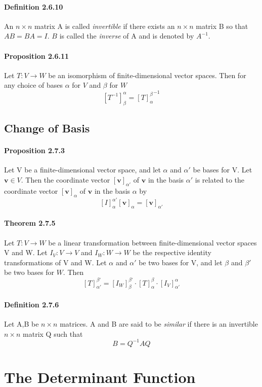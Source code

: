 \documentclass[11pt]{article}
\newcommand{\ti}[1]{\textit{#1}}
\newcommand{\tb}[1]{\textbf{#1}}
\newcommand{\litran}[0]{$T: V \rightarrow W$ }
\newcommand{\vv}[0]{\tb{v}}
\begin{document}
{\paragraph{Definition 2.6.10} An $n \times n$ matrix A is called \ti{invertible} if there exists an $n\times n$ matrix B so that $AB = BA = I$. $B$ is called the \ti{inverse} of A and is denoted by $A^{-1}$.
\paragraph{Proposition 2.6.11} Let \litran be an isomorphism of finite-dimensional vector spaces. Then for any choice of bases $\alpha$ for $V$ and $\beta$ for $W$
$$[T^{-1}]_\beta^\alpha = {[T]_\alpha^{\beta}}^{-1}$$

\subsection{Change of Basis}
\paragraph{Proposition 2.7.3} Let V be a finite-dimensional vector space, and let $\alpha$ and $\alpha'$ be bases for V. Let $\vv \in V$. Then the coordinate vector $[\vv]_{\alpha'}$ of $\vv$ in the basis $\alpha'$ is related to the coordinate vector $[\vv]_\alpha$ of $\vv$ in the basis $\alpha$ by $$[I]_\alpha^{\alpha'}[\vv]_\alpha = [\vv]_{\alpha'}$$
\paragraph{Theorem 2.7.5} Let \litran be a linear transformation between finite-dimensional vector spaces V and W. Let $I_V: V \rightarrow V$ and $I_W: W \rightarrow W$ be the respective identity transformations of V and W. Let $\alpha$ and $\alpha'$ be two bases for V, and let $\beta$ and $\beta'$ be two bases for $W$. Then
$$[T]_{\alpha'}^{\beta'} = [I_W]_\beta^{\beta'}\cdot[T]_\alpha^\beta\cdot[I_V]_{\alpha'}^{\alpha}$$
\paragraph{Definition 2.7.6} Let A,B be $n \times n$ matrices. A and B are said to be \ti{similar} if there is an invertible $n\times n$ matrix Q such that
$$B = Q^{-1}AQ$$

\section{The Determinant Function}
}
\end{document}
